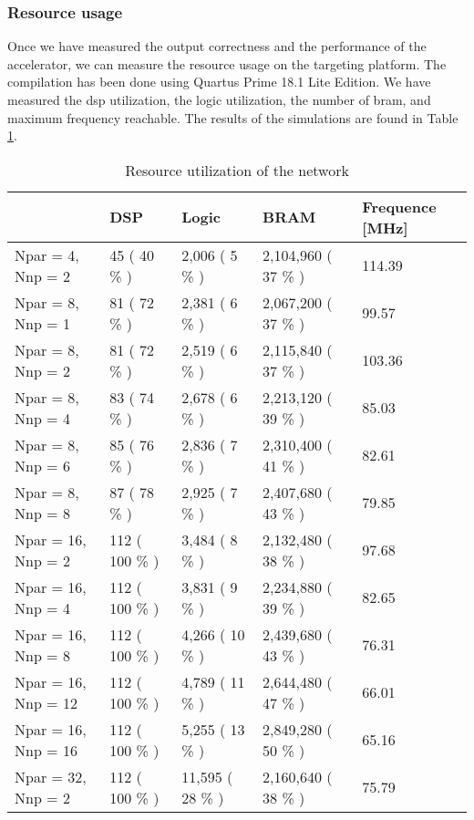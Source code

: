\subsubsection{Resource usage}
%
Once we have measured the output correctness and the performance of the accelerator, we can measure the resource usage on the targeting platform. The compilation has been done using Quartus Prime 18.1 Lite Edition. We have measured the \acrshort{dsp} utilization, the logic utilization, the number of \acrfull{bram}, and maximum frequency reachable. The results of the simulations are found in Table \ref{tab:res-simu}.
%
\begin{table}
\begin{tabular}{|l|l|l|l|l|}
\hline
     & DSP & Logic  & BRAM & Frequence [MHz] \\ \hline
    Npar = 4, Nnp = 2 & 45  ( 40 \% ) & 2,006  ( 5 \% ) & 2,104,960  ( 37 \% ) & 114.39 \\ \hline
    Npar = 8, Nnp = 1 & 81 ( 72 \% ) & 2,381  ( 6 \% ) & 2,067,200  ( 37 \% ) & 99.57  \\ \hline
    Npar = 8, Nnp = 2 & 81  ( 72 \% ) & 2,519 ( 6 \% ) & 2,115,840  ( 37 \% ) & 103.36  \\ \hline
    Npar = 8, Nnp = 4 & 83  ( 74 \% ) & 2,678  ( 6 \% ) & 2,213,120 ( 39 \% ) & 85.03  \\ \hline
    Npar = 8, Nnp = 6 & 85  ( 76 \% ) & 2,836  ( 7 \% ) & 2,310,400  ( 41 \% ) & 82.61 \\ \hline
    Npar = 8, Nnp = 8 & 87 ( 78 \% ) & 2,925 ( 7 \% ) & 2,407,680  ( 43 \% ) & 79.85  \\ \hline
    Npar = 16, Nnp = 2 & 112 ( 100 \% ) & 3,484  ( 8 \% ) & 2,132,480 ( 38 \% ) & 97.68  \\ \hline
    Npar = 16, Nnp = 4 & 112  ( 100 \% ) & 3,831  ( 9 \% ) & 2,234,880 ( 39 \% ) & 82.65 \\ \hline
    Npar = 16, Nnp = 8 & 112  ( 100 \% ) & 4,266 ( 10 \% ) & 2,439,680 ( 43 \% ) & 76.31  \\ \hline
    Npar = 16, Nnp = 12 & 112  ( 100 \% ) & 4,789  ( 11 \% ) & 2,644,480  ( 47 \% ) & 66.01 \\ \hline
    Npar = 16, Nnp = 16 & 112 ( 100 \% ) & 5,255  ( 13 \% ) & 2,849,280 ( 50 \% ) & 65.16 \\ \hline
    Npar = 32, Nnp = 2 & 112 ( 100 \% ) & 11,595  ( 28 \% ) & 2,160,640  ( 38 \% ) & 75.79 \\ \hline
\end{tabular}
    \caption{Resource utilization of the network}
    \label{tab:res-simu}
\end{table}

